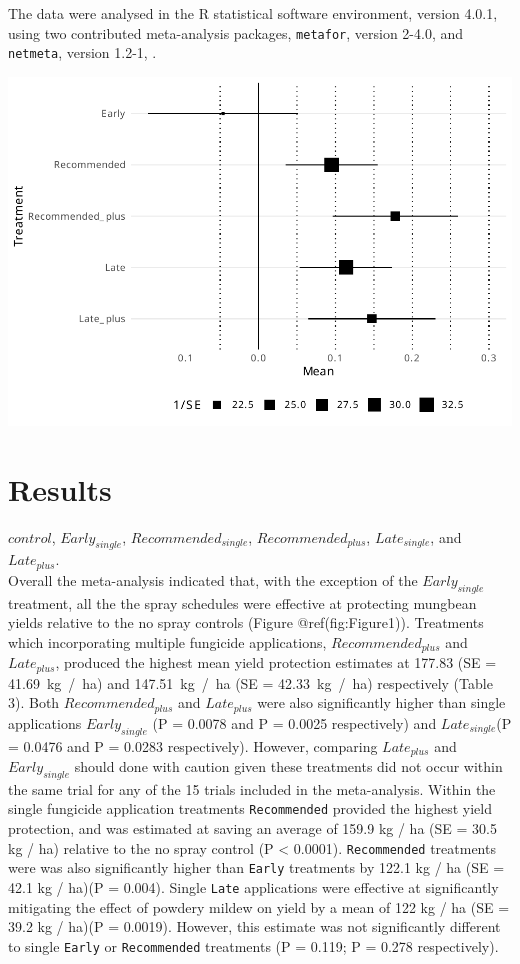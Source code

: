 \documentclass[agronomy,article,submit,moreauthors,pdftex]{mdpi}
\begin{document}
The data were analysed in the R statistical software environment,
version 4.0.1, \citep{RCoreTeam2020} using two contributed meta-analysis
packages, \texttt{metafor}, version 2-4.0, \citep{Viechtbauer2010} and
\texttt{netmeta}, version 1.2-1, \citep{Rucker2020}.

\includegraphics{paper_files/figure-latex/Figure1-1.pdf}

\hypertarget{results}{%
\section{Results}\label{results}}

\(control\), \(Early_{single}\), \(Recommended_{single}\),
\(Recommended_{plus}\), \(Late_{single}\), and \(Late_{plus}\).\\
Overall the meta-analysis indicated that, with the exception of the
\(Early_{single}\) treatment, all the the spray schedules were effective
at protecting mungbean yields relative to the no spray controls (Figure
@ref(fig:Figure1)). Treatments which incorporating multiple fungicide
applications, \(Recommended_{plus}\) and \(Late_{plus}\), produced the
highest mean yield protection estimates at 177.83 (SE = 41.69~kg~/~ha)
and 147.51~kg~/~ha (SE = 42.33~kg~/~ha) respectively (Table 3). Both
\(Recommended_{plus}\) and \(Late_{plus}\) were also significantly
higher than single applications \(Early_{single}\) (P = 0.0078 and P =
0.0025 respectively) and \(Late_{single}\)(P = 0.0476 and P = 0.0283
respectively). However, comparing \(Late_{plus}\) and \(Early_{single}\)
should done with caution given these treatments did not occur within the
same trial for any of the 15 trials included in the meta-analysis.
Within the single fungicide application treatments \texttt{Recommended}
provided the highest yield protection, and was estimated at saving an
average of 159.9 kg / ha (SE = 30.5 kg / ha) relative to the no spray
control (P \textless{} 0.0001). \texttt{Recommended} treatments were was
also significantly higher than \texttt{Early} treatments by 122.1 kg /
ha (SE = 42.1 kg / ha)(P = 0.004). Single \texttt{Late} applications
were effective at significantly mitigating the effect of powdery mildew
on yield by a mean of 122 kg / ha (SE = 39.2 kg / ha)(P = 0.0019).
However, this estimate was not significantly different to single
\texttt{Early} or \texttt{Recommended} treatments (P = 0.119; P = 0.278
respectively).
\end{document}
